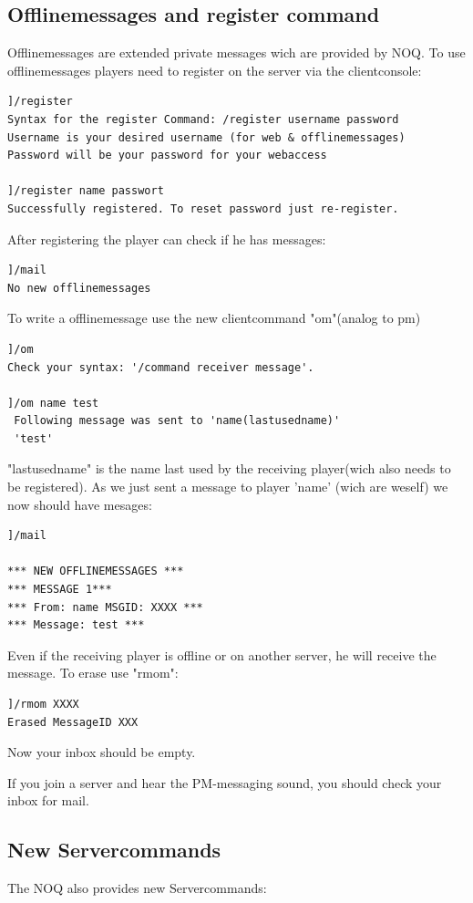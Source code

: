 \documentclass[12pt,a4paper]{article}
\numberwithin{footnote}{page} %
\begin{document}
\subsection{Offlinemessages and register command}
Offlinemessages are extended private messages wich are provided by NOQ.
To use offlinemessages players need to register on the server via the clientconsole:
\\
\begin{lstlisting}
]/register
Syntax for the register Command: /register username password
Username is your desired username (for web & offlinemessages)
Password will be your password for your webaccess

]/register name passwort
Successfully registered. To reset password just re-register.
\end{lstlisting}
After registering the player can check if he has messages:
\\
\begin{lstlisting}
]/mail
No new offlinemessages
\end{lstlisting}

To write a offlinemessage use the new clientcommand "om"(analog to pm)
\begin{lstlisting}
]/om
Check your syntax: '/command receiver message'.

]/om name test
 Following message was sent to 'name(lastusedname)'
 'test'
\end{lstlisting}
"lastusedname" is the name last used by the receiving player(wich also needs to be registered).
As we just sent a message to player 'name' (wich are weself) we now should have mesages:
\\
\begin{lstlisting}
]/mail

*** NEW OFFLINEMESSAGES ***
*** MESSAGE 1***
*** From: name MSGID: XXXX ***
*** Message: test ***
\end{lstlisting}
Even if the receiving player is offline or on another server, he will receive the message.
To erase use "rmom":
\\
\begin{lstlisting}
]/rmom XXXX
Erased MessageID XXX
\end{lstlisting}
Now your inbox should be empty.

If you join a server and hear the PM-messaging sound, you should check your inbox for mail.


\subsection{New Servercommands}
The NOQ also provides new Servercommands:
\end{document}
